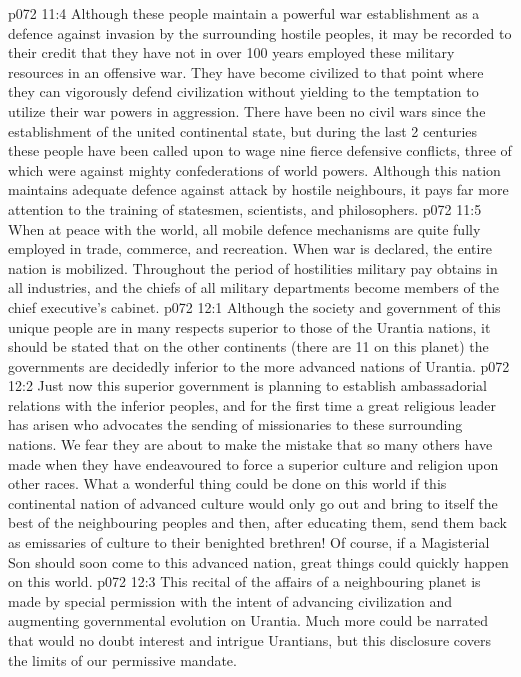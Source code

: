 \vs p072 11:4 \pc Although these people maintain a powerful war establishment as a defence against invasion by the surrounding hostile peoples, it may be recorded to their credit that they have not in over 100 years employed these military resources in an offensive war. They have become civilized to that point where they can vigorously defend civilization without yielding to the temptation to utilize their war powers in aggression. There have been no civil wars since the establishment of the united continental state, but during the last 2 centuries these people have been called upon to wage nine fierce defensive conflicts, three of which were against mighty confederations of world powers. Although this nation maintains adequate defence against attack by hostile neighbours, it pays far more attention to the training of statesmen, scientists, and philosophers.
\vs p072 11:5 When at peace with the world, all mobile defence mechanisms are quite fully employed in trade, commerce, and recreation. When war is declared, the entire nation is mobilized. Throughout the period of hostilities military pay obtains in all industries, and the chiefs of all military departments become members of the chief executive’s cabinet.
\vs p072 12:1 Although the society and government of this unique people are in many respects superior to those of the Urantia nations, it should be stated that on the other continents (there are 11 on this planet) the governments are decidedly inferior to the more advanced nations of Urantia.
\vs p072 12:2 Just now this superior government is planning to establish ambassadorial relations with the inferior peoples, and for the first time a great religious leader has arisen who advocates the sending of missionaries to these surrounding nations. We fear they are about to make the mistake that so many others have made when they have endeavoured to force a superior culture and religion upon other races. What a wonderful thing could be done on this world if this continental nation of advanced culture would only go out and bring to itself the best of the neighbouring peoples and then, after educating them, send them back as emissaries of culture to their benighted brethren! Of course, if a Magisterial Son should soon come to this advanced nation, great things could quickly happen on this world.
\vs p072 12:3 \pc This recital of the affairs of a neighbouring planet is made by special permission with the intent of advancing civilization and augmenting governmental evolution on Urantia. Much more could be narrated that would no doubt interest and intrigue Urantians, but this disclosure covers the limits of our permissive mandate.
